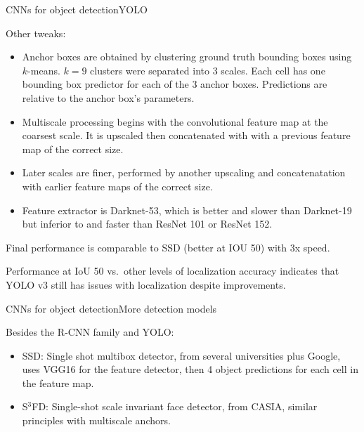 \documentclass[aspectratio=169]{beamer}
\begin{document}
\begin{frame}{CNNs for object detection}{YOLO}

  Other tweaks:
  \begin{itemize}
  \item \alert{Anchor boxes} are obtained by clustering ground truth
    bounding boxes using $k$-means. $k=9$ clusters were separated into
    3 scales. Each cell has one bounding box predictor for each of the
    3 anchor boxes. Predictions are relative to the anchor box's parameters.
  \item Multiscale processing begins with the convolutional feature
    map at the coarsest scale. It is upscaled then concatenated with
    with a previous feature map of the correct size.
  \item Later scales are finer, performed by another upscaling and
    concatenatation with earlier feature maps of the correct size.
  \item Feature extractor is Darknet-53, which is better and slower
    than Darknet-19 but inferior to and faster than ResNet 101 or
    ResNet 152.
  \end{itemize}

  \medskip

  Final performance is comparable to SSD (better at IOU 50) with 3x speed.

  \medskip

  Performance at IoU 50 vs.\ other levels of localization accuracy
  indicates that YOLO v3 still has issues with localization despite
  improvements.
  
\end{frame}


\begin{frame}{CNNs for object detection}{More detection models}

  Besides the R-CNN family and YOLO:
  \begin{itemize}
  \item SSD: Single shot multibox detector, from several universities
    plus Google, uses VGG16 for the feature detector, then 4 object
    predictions for each cell in the feature map.
  \item S$^3$FD: Single-shot scale invariant face detector, from
    CASIA, similar principles with multiscale anchors.
  \end{itemize}

\end{frame}

\end{document}

